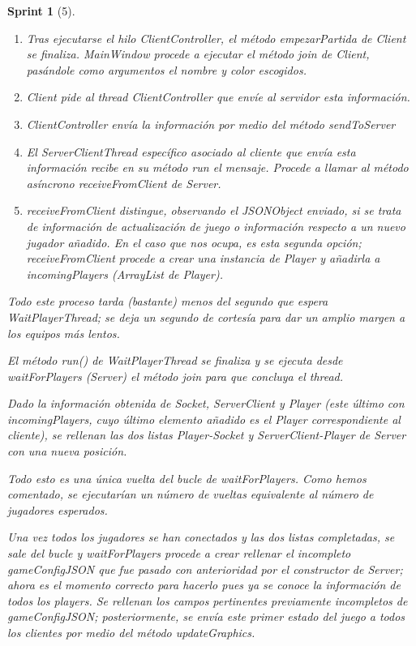 \documentclass[12pt,a4paper,openright]{book}
\theoremstyle{break}
\newtheorem*{sprint}{Sprint}
\begin{document}
\begin{sprint}[5]
\begin{enumerate}
\item Tras ejecutarse el hilo ClientController, el método empezarPartida de Client se finaliza. MainWindow procede a ejecutar el método join de Client, pasándole como argumentos el nombre y color escogidos.
\item Client pide al thread ClientController que envíe al servidor esta información.
\item ClientController envía la información por medio del método sendToServer
\item El ServerClientThread específico asociado al cliente que envía esta información recibe en su método run el mensaje. Procede a llamar al método asíncrono receiveFromClient de Server.
\item receiveFromClient distingue, observando el JSONObject enviado, si se trata de información de actualización de juego o información respecto a un nuevo jugador añadido. En el caso que nos ocupa, es esta segunda opción; receiveFromClient procede a crear una instancia de Player y añadirla a incomingPlayers (ArrayList de Player).
\end{enumerate}

Todo este proceso tarda (bastante) menos del segundo que espera WaitPlayerThread; se deja un segundo de cortesía para dar un amplio margen a los equipos más lentos.

El método run() de WaitPlayerThread se finaliza y se ejecuta desde waitForPlayers (Server) el método join para que concluya el thread.

Dado la información obtenida de Socket, ServerClient y Player (este último con incomingPlayers, cuyo último elemento añadido es el Player correspondiente al cliente), se rellenan las dos listas Player-Socket y ServerClient-Player de Server con una nueva posición.

Todo esto es una única vuelta del bucle de waitForPlayers. Como hemos comentado, se ejecutarían un número de vueltas equivalente al número de jugadores esperados.

Una vez todos los jugadores se han conectados y las dos listas completadas, se sale del bucle y waitForPlayers procede a crear rellenar el incompleto gameConfigJSON que fue pasado con anterioridad por el constructor de Server; ahora es el momento correcto para hacerlo pues ya se conoce la información de todos los players. Se rellenan los campos pertinentes previamente incompletos de gameConfigJSON; posteriormente, se envía este primer estado del juego a todos los clientes por medio del método updateGraphics.


\end{sprint}
\end{document}
